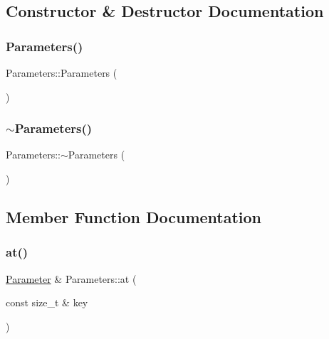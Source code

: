 \subsection{Constructor \& Destructor Documentation}
\mbox{\label{class_parameters_af4d94ee360ac0157d9065f78797fe9a1}} 
\subsubsection{\texorpdfstring{Parameters()}{Parameters()}}
{\footnotesize\ttfamily Parameters\+::\+Parameters (\begin{DoxyParamCaption}{ }\end{DoxyParamCaption})}

\mbox{\label{class_parameters_a640a1a349975a8cb023696f25e563a5c}} 
\subsubsection{\texorpdfstring{$\sim$\+Parameters()}{~Parameters()}}
{\footnotesize\ttfamily Parameters\+::$\sim$\+Parameters (\begin{DoxyParamCaption}{ }\end{DoxyParamCaption})\hspace{0.3cm}{\ttfamily [virtual]}}



\subsection{Member Function Documentation}
\mbox{\label{class_parameters_a719a79f29caa1c2adeee85ab8a963f40}} 
\subsubsection{\texorpdfstring{at()}{at()}\hspace{0.1cm}{\footnotesize\ttfamily [1/2]}}
{\footnotesize\ttfamily \mbox{\hyperlink{class_parameter}{Parameter}} \& Parameters\+::at (\begin{DoxyParamCaption}\item[{const size\+\_\+t \&}]{key }\end{DoxyParamCaption})}

